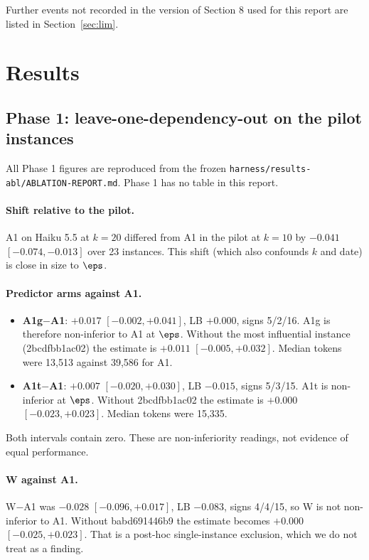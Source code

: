 Further events not recorded in the version of Section 8 used for this report are listed in Section~\ref{sec:lim}.

\section{Results}



\subsection{Phase 1: leave-one-dependency-out on the pilot instances}

All Phase 1 figures are reproduced from the frozen \texttt{harness/results-abl/ABLATION-REPORT.md}. Phase 1 has no table in this report.

\paragraph{Shift relative to the pilot.} A1 on Haiku 5.5 at $k=20$ differed from A1 in the pilot at $k=10$ by $-0.041$ $[-0.074, -0.013]$ over 23 instances. This shift (which also confounds $k$ and date) is close in size to $\eps$.

\paragraph{Predictor arms against A1.}
\begin{itemize}
\item \textbf{A1g$-$A1}: $+0.017$ $[-0.002, +0.041]$, LB $+0.000$, signs 5/2/16. A1g is therefore non-inferior to A1 at $\eps$. Without the most influential instance (2bcdfbb1ac02) the estimate is $+0.011$ $[-0.005, +0.032]$. Median tokens were 13,513 against 39,586 for A1.
\item \textbf{A1t$-$A1}: $+0.007$ $[-0.020, +0.030]$, LB $-0.015$, signs 5/3/15. A1t is non-inferior at $\eps$. Without 2bcdfbb1ac02 the estimate is $+0.000$ $[-0.023, +0.023]$. Median tokens were 15,335.
\end{itemize}
Both intervals contain zero. These are non-inferiority readings, not evidence of equal performance.

\paragraph{W against A1.} W$-$A1 was $-0.028$ $[-0.096, +0.017]$, LB $-0.083$, signs 4/4/15, so W is not non-inferior to A1. Without babd691446b9 the estimate becomes $+0.000$ $[-0.025, +0.023]$. That is a post-hoc single-instance exclusion, which we do not treat as a finding.

